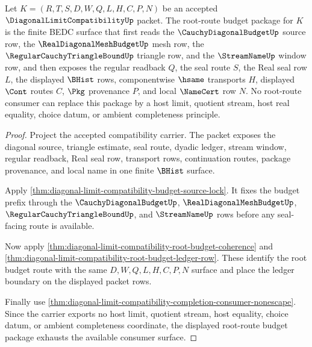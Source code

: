\begin{theorem}
\label{thm:diagonal-limit-compatibility-root-route-budget-package}
Let $K=(R,T,S,D,W,Q,L,H,C,P,N)$ be an accepted $\DiagonalLimitCompatibilityUp$ packet. The root-route budget package for $K$ is the finite BEDC surface that first reads the $\CauchyDiagonalBudgetUp$ source row, the $\RealDiagonalMeshBudgetUp$ mesh row, the $\RegularCauchyTriangleBoundUp$ triangle row, and the $\StreamNameUp$ window row, and then exposes the regular readback $Q$, the seal route $S$, the Real seal row $L$, the displayed $\BHist$ rows, componentwise $\hsame$ transports $H$, displayed $\Cont$ routes $C$, $\Pkg$ provenance $P$, and local $\NameCert$ row $N$. No root-route consumer can replace this package by a host limit, quotient stream, host real equality, choice datum, or ambient completeness principle.
\end{theorem}
\begin{proof}
Project the accepted compatibility carrier. The packet exposes the diagonal source, triangle estimate, seal route, dyadic ledger, stream window, regular readback, Real seal row, transport rows, continuation routes, package provenance, and local name in one finite $\BHist$ surface.

Apply \autoref{thm:diagonal-limit-compatibility-budget-source-lock}. It fixes the budget prefix through the $\CauchyDiagonalBudgetUp$, $\RealDiagonalMeshBudgetUp$, $\RegularCauchyTriangleBoundUp$, and $\StreamNameUp$ rows before any seal-facing route is available.

Now apply \autoref{thm:diagonal-limit-compatibility-root-budget-coherence} and \autoref{thm:diagonal-limit-compatibility-root-budget-ledger-row}. These identify the root budget route with the same $D,W,Q,L,H,C,P,N$ surface and place the ledger boundary on the displayed packet rows.

Finally use \autoref{thm:diagonal-limit-compatibility-completion-consumer-nonescape}. Since the carrier exports no host limit, quotient stream, host equality, choice datum, or ambient completeness coordinate, the displayed root-route budget package exhausts the available consumer surface.
\end{proof}


